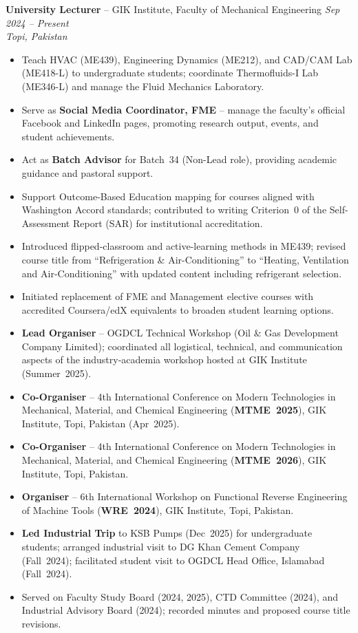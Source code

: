 \documentclass[11pt,a4paper]{article}
\begin{document}
\textbf{University Lecturer} -- GIK Institute, Faculty of Mechanical Engineering
\hfill \textit{Sep 2024 -- Present}\\
\textit{Topi, Pakistan}
\begin{itemize}
  \item Teach HVAC (ME439), Engineering Dynamics (ME212), and CAD/CAM Lab
        (ME418-L) to undergraduate students; coordinate Thermofluids-I Lab
        (ME346-L) and manage the Fluid Mechanics Laboratory.
  \item Serve as \textbf{Social Media Coordinator, FME} -- manage the faculty's
        official Facebook and LinkedIn pages, promoting research output, events,
        and student achievements.
  \item Act as \textbf{Batch Advisor} for Batch~34 (Non-Lead role), providing
        academic guidance and pastoral support.
  \item Support Outcome-Based Education mapping for courses aligned with
        Washington Accord standards; contributed to writing Criterion~0 of the
        Self-Assessment Report (SAR) for institutional accreditation.
  \item Introduced flipped-classroom and active-learning methods in ME439; revised
        course title from ``Refrigeration \& Air-Conditioning'' to ``Heating,
        Ventilation and Air-Conditioning'' with updated content including
        refrigerant selection.
  \item Initiated replacement of FME and Management elective courses with
        accredited Coursera/edX equivalents to broaden student learning options.
  \item \textbf{Lead Organiser} -- OGDCL Technical Workshop (Oil \& Gas
        Development Company Limited); coordinated all logistical, technical, and
        communication aspects of the industry-academia workshop hosted at GIK
        Institute (Summer~2025).
  \item \textbf{Co-Organiser} -- 4th International Conference on Modern
        Technologies in Mechanical, Material, and Chemical Engineering
        (\textbf{MTME~2025}), GIK Institute, Topi, Pakistan (Apr~2025).
  \item \textbf{Co-Organiser} -- 4th International Conference on Modern
        Technologies in Mechanical, Material, and Chemical Engineering
        (\textbf{MTME~2026}), GIK Institute, Topi, Pakistan.
  \item \textbf{Organiser} -- 6th International Workshop on Functional Reverse
        Engineering of Machine Tools (\textbf{WRE~2024}), GIK Institute,
        Topi, Pakistan.
  \item \textbf{Led Industrial Trip} to KSB Pumps (Dec~2025) for undergraduate
        students; arranged industrial visit to DG Khan Cement Company (Fall~2024);
        facilitated student visit to OGDCL Head Office, Islamabad (Fall~2024).
  \item Served on Faculty Study Board (2024, 2025), CTD Committee (2024), and
        Industrial Advisory Board (2024); recorded minutes and proposed course
        title revisions.
\end{itemize}
\end{document}
